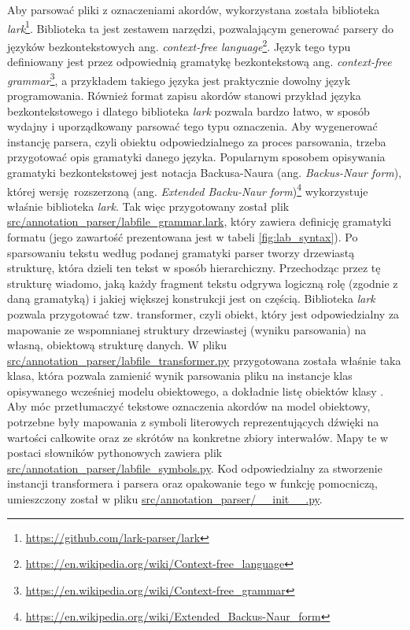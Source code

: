 Aby parsować pliki z oznaczeniami akordów, wykorzystana została biblioteka \emph{lark}\footnote{\url{https://github.com/lark-parser/lark}}. Biblioteka ta jest zestawem narzędzi, pozwalającym generować parsery do języków bezkontekstowych ang. \emph{context-free language}\footnote{\url{https://en.wikipedia.org/wiki/Context-free_language}}. Język tego typu definiowany jest przez odpowiednią gramatykę bezkontekstową ang. \emph{context-free grammar}\footnote{\url{https://en.wikipedia.org/wiki/Context-free_grammar}}, a przykładem takiego języka jest praktycznie dowolny język programowania. Również format zapisu akordów stanowi przykład języka bezkontekstowego i dlatego biblioteka \emph{lark} pozwala bardzo łatwo, w sposób wydajny i uporządkowany parsować tego typu oznaczenia. Aby wygenerować instancję parsera, czyli obiektu odpowiedzialnego za proces parsowania, trzeba przygotować opis gramatyki danego języka. Popularnym sposobem opisywania gramatyki bezkontekstowej jest notacja Backusa-Naura (ang. \emph{Backus-Naur form}), której wersję rozszerzoną (ang. \emph{Extended Backu-Naur form})\footnote{\url{https://en.wikipedia.org/wiki/Extended_Backus-Naur_form}} wykorzystuje właśnie biblioteka \emph{lark}. Tak więc przygotowany został plik \url{src/annotation_parser/labfile_grammar.lark}, który zawiera definicję gramatyki formatu  (jego zawartość prezentowana jest w tabeli \ref{fig:lab_syntax}). Po sparsowaniu tekstu według podanej gramatyki parser tworzy drzewiastą strukturę, która dzieli ten tekst w sposób hierarchiczny. Przechodząc przez tę strukturę wiadomo, jaką każdy fragment tekstu odgrywa logiczną rolę (zgodnie z daną gramatyką) i jakiej większej konstrukcji jest on częścią. Biblioteka \emph{lark} pozwala przygotować tzw. transformer, czyli obiekt, który jest odpowiedzialny za mapowanie ze wspomnianej struktury drzewiastej (wyniku parsowania) na własną, obiektową strukturę danych. W pliku \url{src/annotation_parser/labfile_transformer.py} przygotowana została właśnie taka klasa, która pozwala zamienić wynik parsowania pliku  na instancje klas opisywanego wcześniej modelu obiektowego, a dokładnie listę obiektów klasy . Aby móc przetłumaczyć tekstowe oznaczenia akordów na model obiektowy, potrzebne były mapowania z symboli literowych reprezentujących dźwięki na wartości całkowite oraz ze skrótów na konkretne zbiory interwałów. Mapy te w postaci słowników pythonowych zawiera plik \url{src/annotation_parser/labfile_symbols.py}. Kod odpowiedzialny za stworzenie instancji transformera i parsera oraz opakowanie tego w funkcję pomocniczą, umieszczony został w pliku \url{src/annotation_parser/__init__.py}. 

